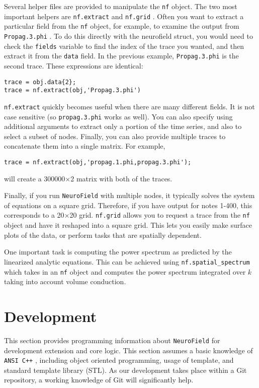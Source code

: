 \documentclass[12pt,a4paper]{article}
\newcommand{\type}[1]{{\small\small\tt #1} }
\newcommand{\NF}[0]{\type{NeuroField}}
\begin{document}
Several helper files are provided to manipulate the \type{nf} object. The two most important helpers are \type{nf.extract} and \type{nf.grid}. Often you want to extract a particular field from the \type{nf} object, for example, to examine the output from \type{Propag.3.phi}. To do this directly with the neurofield struct, you would need to check the \type{fields} variable to find the index of the trace you wanted, and then extract it from the \type{data} field. In the previous example, \type{Propag.3.phi} is the second trace. These expressions are identical:
\begin{lstlisting}
trace = obj.data{2};
trace = nf.extract(obj,'Propag.3.phi')
\end{lstlisting}
\type{nf.extract} quickly becomes useful when there are many different fields. It is not case sensitive (so \type{propag.3.phi} works as well). You can also specify using additional arguments to extract only a portion of the time series, and also to select a subset of nodes. Finally, you can also provide multiple traces to concatenate them into a single matrix. For example,
\begin{lstlisting}
trace = nf.extract(obj,'propag.1.phi,propag.3.phi');
\end{lstlisting}
will create a 300000$\times$2 matrix with both of the traces. 

Finally, if you run \NF with multiple nodes, it typically solves the system of equations on a square grid. Therefore, if you have output for notes 1-400, this corresponds to a 20$\times$20 grid. \type{nf.grid} allows you to request a trace from the \type{nf} object and have it reshaped into a square grid. This lets you easily make surface plots of the data, or perform tasks that are spatially dependent. 

One important task is computing the power spectrum as predicted by the linearized analytic equations. This can be achieved using \type{nf.spatial\_spectrum} which takes in an \type{nf} object and computes the power spectrum integrated over $k$ taking into account volume conduction. 

\section{Development}

This section provides programming information about \NF for development extension and core logic. This section assumes a basic knowledge of \type{ANSI C++}, including object oriented programming, usage of template, and standard template library (STL). As our development takes place within a Git repository, a working knowledge of Git will significantly help. 
\end{document}
